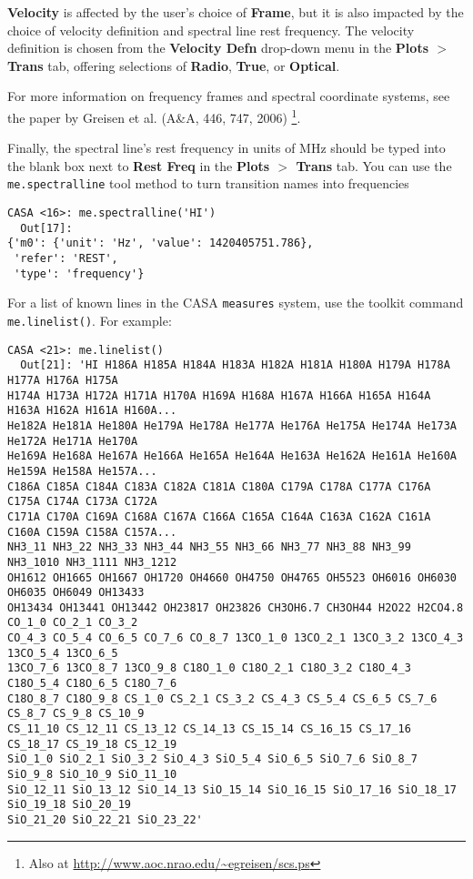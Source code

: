 {\bf Velocity} is affected by the user's choice of {\bf Frame}, but it is also impacted by the choice of velocity definition and spectral line rest frequency. The velocity definition is chosen from the {\bf Velocity Defn} drop-down menu in the {\bf Plots $>$ Trans} tab, offering selections of {\bf Radio}, {\bf True}, or {\bf Optical}. 

For more information on frequency frames and spectral coordinate systems, see the paper by Greisen et al. (A\&A, 446, 747, 2006) \footnote{Also at \url{http://www.aoc.nrao.edu/~egreisen/scs.ps}}.

Finally, the spectral line's rest frequency in units of MHz should be typed into the blank box next to {\bf Rest Freq} in the {\bf Plots $>$ Trans} tab. You can use the {\tt me.spectralline} tool method to turn transition names into frequencies 
\small
\begin{verbatim}
CASA <16>: me.spectralline('HI')
  Out[17]: 
{'m0': {'unit': 'Hz', 'value': 1420405751.786},
 'refer': 'REST',
 'type': 'frequency'}
\end{verbatim}
\normalsize

For a list of known lines in the CASA {\tt measures} system, use the toolkit command {\tt me.linelist()}.  For example:
\small
\begin{verbatim}
CASA <21>: me.linelist()
  Out[21]: 'HI H186A H185A H184A H183A H182A H181A H180A H179A H178A H177A H176A H175A 
H174A H173A H172A H171A H170A H169A H168A H167A H166A H165A H164A H163A H162A H161A H160A... 
He182A He181A He180A He179A He178A He177A He176A He175A He174A He173A He172A He171A He170A 
He169A He168A He167A He166A He165A He164A He163A He162A He161A He160A He159A He158A He157A...
C186A C185A C184A C183A C182A C181A C180A C179A C178A C177A C176A C175A C174A C173A C172A 
C171A C170A C169A C168A C167A C166A C165A C164A C163A C162A C161A C160A C159A C158A C157A... 
NH3_11 NH3_22 NH3_33 NH3_44 NH3_55 NH3_66 NH3_77 NH3_88 NH3_99 NH3_1010 NH3_1111 NH3_1212 
OH1612 OH1665 OH1667 OH1720 OH4660 OH4750 OH4765 OH5523 OH6016 OH6030 OH6035 OH6049 OH13433 
OH13434 OH13441 OH13442 OH23817 OH23826 CH3OH6.7 CH3OH44 H2O22 H2CO4.8 CO_1_0 CO_2_1 CO_3_2 
CO_4_3 CO_5_4 CO_6_5 CO_7_6 CO_8_7 13CO_1_0 13CO_2_1 13CO_3_2 13CO_4_3 13CO_5_4 13CO_6_5 
13CO_7_6 13CO_8_7 13CO_9_8 C18O_1_0 C18O_2_1 C18O_3_2 C18O_4_3 C18O_5_4 C18O_6_5 C18O_7_6 
C18O_8_7 C18O_9_8 CS_1_0 CS_2_1 CS_3_2 CS_4_3 CS_5_4 CS_6_5 CS_7_6 CS_8_7 CS_9_8 CS_10_9 
CS_11_10 CS_12_11 CS_13_12 CS_14_13 CS_15_14 CS_16_15 CS_17_16 CS_18_17 CS_19_18 CS_12_19 
SiO_1_0 SiO_2_1 SiO_3_2 SiO_4_3 SiO_5_4 SiO_6_5 SiO_7_6 SiO_8_7 SiO_9_8 SiO_10_9 SiO_11_10 
SiO_12_11 SiO_13_12 SiO_14_13 SiO_15_14 SiO_16_15 SiO_17_16 SiO_18_17 SiO_19_18 SiO_20_19 
SiO_21_20 SiO_22_21 SiO_23_22'
\end{verbatim}
\normalsize

